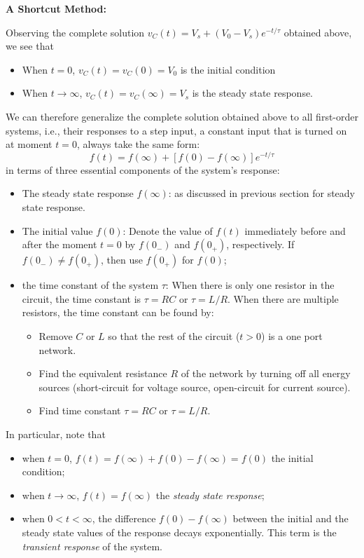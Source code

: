 {\bf A Shortcut Method:}

Observing the complete solution $v_C(t)=V_s+(V_0-V_s) e^{-t/\tau}$ obtained
above, we see that
\begin{itemize}
\item When $t=0$, $v_C(t)=v_C(0)=V_0$ is the initial condition
\item When $t\rightarrow \infty$, $v_C(t)=v_C(\infty)=V_s$ is the steady 
  state response.
\end{itemize}

We can therefore generalize the complete solution obtained above to all 
first-order systems, i.e., their responses to a step input, a constant input 
that is turned on at moment $t=0$, always take the same form: 
\[
f(t)=f(\infty)+[f(0)-f(\infty)] e^{-t/\tau}	
\]
in terms of three essential components of the system's response:
\begin{itemize}
\item The steady state response $f(\infty)$: as discussed in previous 
  section for steady state response.
\item The initial value $f(0)$: 
  Denote the value of $f(t)$ immediately before and after the moment
  $t=0$ by $f(0_-)$ and $f(0_+)$, respectively. If $f(0_-)\ne f(0_+)$, 
  then use $f(0_+)$ for $f(0)$;
\item the time constant of the system $\tau$: When there is only one 
  resistor in the circuit, the time constant is $\tau=RC$ or $\tau=L/R$.
  When there are multiple resistors, the time constant can be found by:
  \begin{itemize}
  \item Remove $C$ or $L$ so that the rest of the circuit ($t>0$) is a 
    one port network.
  \item Find the equivalent resistance $R$ of the network by turning off 
    all energy sources (short-circuit for voltage source, open-circuit 
    for current source).
  \item Find time constant $\tau=RC$ or $\tau=L/R$.
  \end{itemize}
\end{itemize}

In particular, note that
\begin{itemize}
  \item when $t=0$, $f(t)=f(\infty)+f(0)-f(\infty)=f(0)$ the initial condition;
  \item when $t\rightarrow \infty$, $f(t)=f(\infty)$ the {\em steady state response};
  \item when $0 < t < \infty$, the difference $f(0)-f(\infty)$ between the initial 
    and the steady state values of the response decays exponentially. This term is 
    the {\em transient response} of the system.
\end{itemize}


